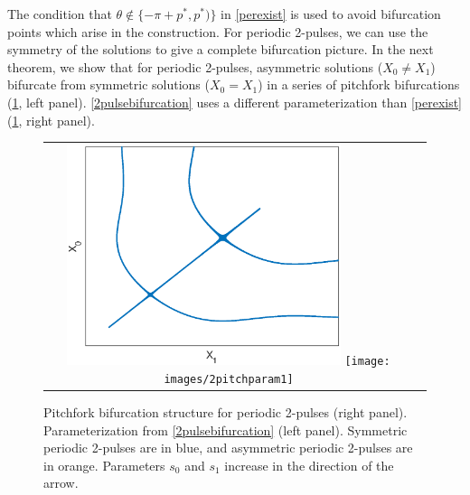 \documentclass[11pt,reqno]{amsart}
\theoremstyle{plain}
\theoremstyle{definition}
\theoremstyle{remark}
\begin{document}
The condition that $\theta \notin \{-\pi + p^*, p^*) \}$ in \cref{perexist} is used to avoid bifurcation points which arise in the construction. For periodic 2-pulses, we can use the symmetry of the solutions to give a complete bifurcation picture. In the next theorem, we show that for periodic 2-pulses, asymmetric solutions ($X_0 \neq X_1$) bifurcate from symmetric solutions ($X_0 = X_1$) in a series of pitchfork bifurcations (\cref{fig:2pitch}, left panel). \cref{2pulsebifurcation} uses a different parameterization than \cref{perexist} (\cref{fig:2pitch}, right panel).

\begin{figure}[H]
\begin{center}
\begin{tabular}{cc}
\includegraphics[width=8cm]{images/2pitchfork.eps}
\texttt{[image: images/2pitchparam1]}
\end{tabular}
\end{center}
\caption[Pitchfork bifurcation structure for periodic 2-pulses]{Pitchfork bifurcation structure for periodic 2-pulses (right panel). Parameterization from \cref{2pulsebifurcation} (left panel). Symmetric periodic 2-pulses are in blue, and asymmetric periodic 2-pulses are in orange. Parameters $s_0$ and $s_1$ increase in the direction of the arrow.}
\label{fig:2pitch}
\end{figure} 
\end{document}
